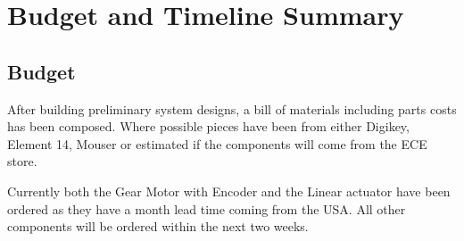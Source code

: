 \chapter{Budget and Timeline Summary}

\section{Budget}
After building preliminary system designs, a bill of materials including parts
costs has been composed. Where possible pieces have been from either Digikey,
Element 14, Mouser or estimated if the components will come from the ECE store.

Currently both the Gear Motor with Encoder and the Linear actuator have been
ordered as they have a month lead time coming from the USA. All other components
will be ordered within the next two weeks.

